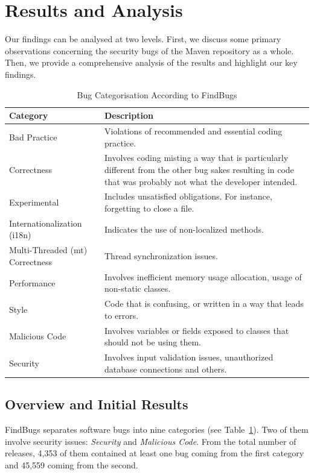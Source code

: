 \documentclass{sig-alternate}
\begin{document}
\section{Results and Analysis}
\label{sec:res}

Our findings can be analysed at two levels. First, we discuss some
primary observations concerning the security bugs of the Maven repository as a whole.
Then, we provide a comprehensive analysis of the results and highlight our key findings.

\begin{table}[t]
\centering
\caption{Bug Categorisation According to FindBugs}
\label{tbl:bug-cat}
\begin{tabular}{l p{35em}}
\hline
Category & Description\\
\hline
Bad Practice & Violations of recommended and essential
coding practice. \\
Correctness & Involves coding misting a way that is particularly different from the other bug sakes resulting in code
that was probably not what the developer intended. \\
Experimental & Includes unsatisfied obligations. For instance,
forgetting to close a file. \\
Internationalization (i18n) & Indicates the use of non-localized methods. \\
Multi-Threaded ({\sc mt}) Correctness & Thread synchronization issues. \\
Performance & Involves inefficient memory usage allocation, usage 
of non-static classes. \\
Style & Code that is confusing, or
written in a way that leads to errors.\\
Malicious Code & Involves variables or fields exposed to classes that should
not be using them. \\
Security & Involves input validation issues, unauthorized database connections
and others. \\
\hline
\end{tabular}
\end{table}

\subsection{Overview and Initial Results}
\label{sec:overview}

FindBugs separates software bugs into nine categories (see
Table~\ref{tbl:bug-cat}). Two of them involve security issues: {\it Security} and {\it
Malicious Code}. From the total number of releases, 4,353 of them contained
at least one bug coming from the first category
and 45,559 coming from the second.
\end{document}
